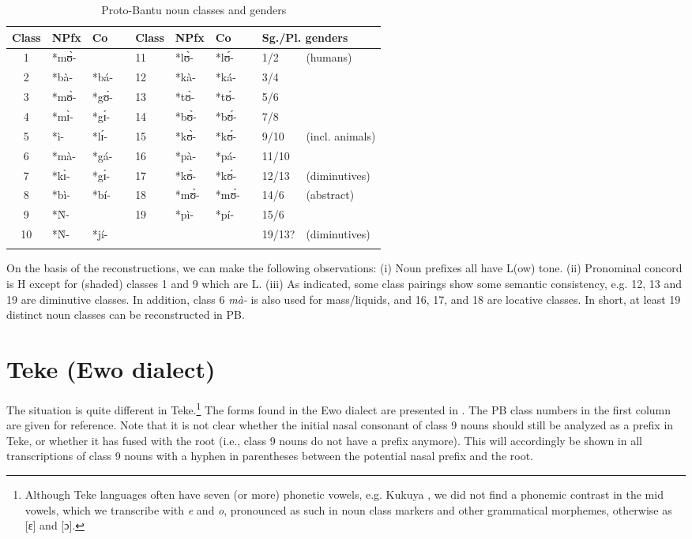 \documentclass[output=paper,,modfonts,nonflat]{langsci/langscibook}
\begin{document}
\begin{table}[!htbp]
\caption{Proto-Bantu noun classes and genders}
\begin{small}
\label{table1}
\begin{tabular}{cllcllll@{\qquad\qquad}ll }
\lsptoprule
Class	&	NPfx	&	Co	&		&	Class	&	NPfx	&	Co	&		&	\multicolumn{2}{l}{Sg./Pl. genders}			\\	
\midrule
1	&	*mʊ̀-	&	\higr{*ʊ̀-}	&		&	11	&	*lʊ̀-	&	*lʊ́-	&		&	1/2	&	(humans)	\\	
2	&	*bà-	&	*bá-	&		&	12	&	*kà-	&	*ká-	&		&	3/4	&		\\	
3	&	*mʊ̀-	&	*gʊ́-	&		&	13	&	*tʊ̀-	&	*tʊ́-	&		&	5/6	&		\\	
4	&	*mɪ̀-	&	*gɪ́-	&		&	14	&	*bʊ̀-	&	*bʊ́-	&		&	7/8	&		\\	
5	&	*ì-	&	*lɪ́-	&		&	15	&	*kʊ̀-	&	*kʊ́-	&		&	9/10	&	(incl. animals)	\\	
6	&	*mà-	&	*gá-	&		&	16	&	*pà-	&	*pá-	&		&	11/10	&		\\	
7	&	*kɪ̀-	&	*gɪ́-	&		&	17	&	*kʊ̀-	&	*kʊ́-	&		&	12/13	&	(diminutives)	\\	
8	&	*bì-	&	*bí-	&		&	18	&	*mʊ̀-	&	*mʊ́-	&		&	14/6	&	(abstract)	\\	
9	&	*Ǹ-	&	\higr{*jɪ̀-}	&		&	19	&	*pì-	&	*pí-	&		&	15/6	&		\\	
10	&	*Ǹ-	&	*jí-	&		&		&		&		&		&	19/13?	&	(diminutives)	\\	\lspbottomrule
\end{tabular}
\end{small}
\end{table}


On the basis of the reconstructions, we can make the following observations: (i) Noun prefixes all have L(ow) tone. (ii) Pronominal concord is H except for (shaded) classes 1 and 9 which are L. (iii) As indicated, some class pairings show some semantic consistency, e.g. 12, 13 and 19 are diminutive classes. In addition, class 6 \textit{mà-} is also used for mass/liquids, and 16, 17, and 18 are locative classes. In short, at least 19 distinct noun classes can be reconstructed in PB.

 
\section{Teke (Ewo dialect)} 
\label{3-Teke}

The situation is quite different in Teke.\footnote{Although Teke languages often have seven (or more) phonetic vowels, e.g. Kukuya \citep{paulian1975}, we did not find a phonemic contrast in the mid vowels, which we transcribe with \emph{e} and \emph{o}, pronounced as such in noun class markers and other grammatical morphemes, otherwise as [ɛ] and [ɔ].} The forms found in the Ewo dialect are presented in . The PB class numbers in the first column are given for reference. Note that it is not clear whether the initial nasal consonant of class 9 nouns should still be analyzed as a prefix in Teke, or whether it has fused with the root (i.e., class 9 nouns do not have a prefix anymore). This will accordingly be shown in all transcriptions of class 9 nouns with a hyphen in parentheses between the potential nasal prefix and the root.
\end{document}
